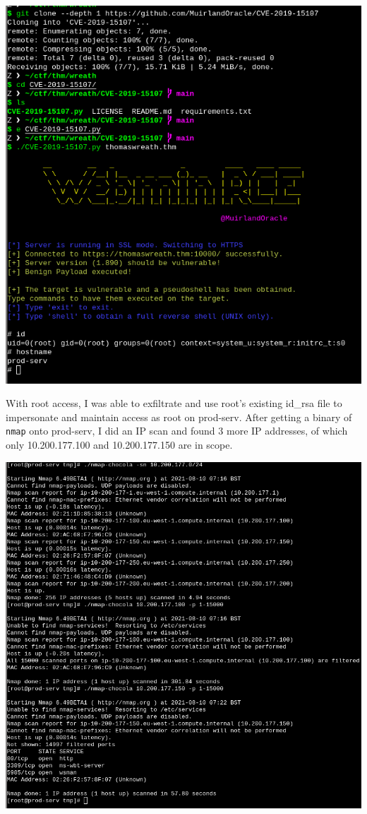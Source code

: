 \includegraphics[width=\textwidth]{img/CVE-2019-15107.png}

With root access, I was able to exfiltrate and use root's existing id\_rsa file to impersonate and maintain access as root on prod-serv. After getting a binary of \lstinline{nmap} onto prod-serv, I did an IP scan and found 3 more IP addresses, of which only 10.200.177.100 and 10.200.177.150 are in scope.

\includegraphics[width=\textwidth]{img/nmap-200.png}

